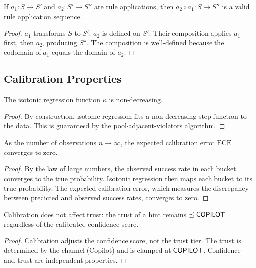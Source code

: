 \documentclass[11pt]{article}
\begin{document}
\begin{lemma}%
\label{lem:compwd}
If $a_1 \colon S \to S'$ and $a_2 \colon S' \to S''$ are
rule applications, then $a_2 \circ a_1 \colon S \to S''$ is
a valid rule application sequence.
\end{lemma}
\begin{proof}
$a_1$ transforms $S$ to $S'$.  $a_2$ is defined on $S'$.
Their composition applies $a_1$ first, then $a_2$, producing
$S''$.  The composition is well-defined because the codomain
of $a_1$ equals the domain of $a_2$.
\end{proof}

\subsection{Calibration Properties}

\begin{lemma}%
\label{lem:isomono}
The isotonic regression function $\kappa$ is non-decreasing.
\end{lemma}
\begin{proof}
By construction, isotonic regression fits a non-decreasing
step function to the data.  This is guaranteed by the
pool-adjacent-violators algorithm.
\end{proof}

\begin{lemma}%
\label{lem:caliberr}
As the number of observations $n \to \infty$, the expected
calibration error $\mathrm{ECE}$ converges to zero.
\end{lemma}
\begin{proof}
By the law of large numbers, the observed success rate in
each bucket converges to the true probability.  Isotonic
regression then maps each bucket to its true probability.
The expected calibration error, which measures the
discrepancy between predicted and observed success rates,
converges to zero.
\end{proof}

\begin{lemma}%
\label{lem:hintceilcalib}
Calibration does not affect trust: the trust of a hint
remains $\preceq \mathsf{COPILOT}$ regardless of the calibrated
confidence score.
\end{lemma}
\begin{proof}
Calibration adjusts the confidence score, not the trust
tier.  The trust is determined by the channel (Copilot)
and is clamped at $\mathsf{COPILOT}$.  Confidence and trust are
independent properties.
\end{proof}
\end{document}

